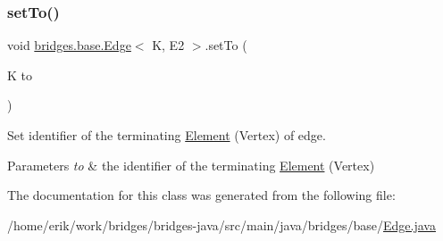 \subsubsection{\texorpdfstring{set\+To()}{setTo()}}
{\footnotesize\ttfamily void \hyperlink{classbridges_1_1base_1_1_edge}{bridges.\+base.\+Edge}$<$ K, E2 $>$.set\+To (\begin{DoxyParamCaption}\item[{K}]{to }\end{DoxyParamCaption})}



Set identifier of the terminating \hyperlink{classbridges_1_1base_1_1_element}{Element} (Vertex) of edge. 


\begin{DoxyParams}{Parameters}
{\em to} & the identifier of the terminating \hyperlink{classbridges_1_1base_1_1_element}{Element} (Vertex) \\
\hline
\end{DoxyParams}


The documentation for this class was generated from the following file\+:\begin{DoxyCompactItemize}
\item 
/home/erik/work/bridges/bridges-\/java/src/main/java/bridges/base/\hyperlink{_edge_8java}{Edge.\+java}\end{DoxyCompactItemize}
